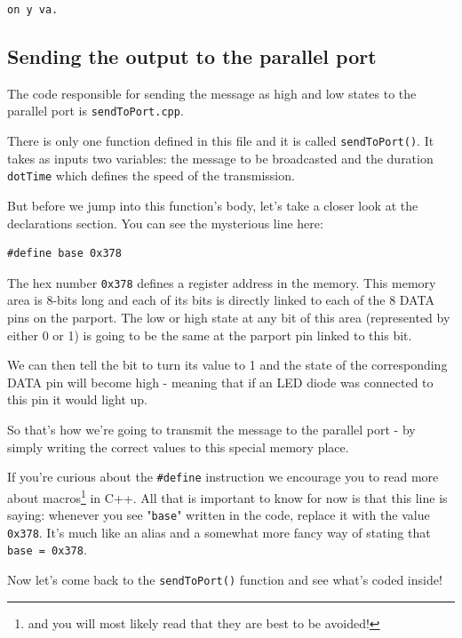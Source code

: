 \documentclass[12pt]{report}
\begin{document}
\begin{snugshade}
\verb|on y va.|
\end{snugshade}

\newpage

\subsection{Sending the output to the parallel port}

The code responsible for sending the message as high and low states to the parallel port is \verb|sendToPort.cpp|.

There is only one function defined in this file and it is called \texttt{sendToPort()}. It takes as inputs two variables: the message to be broadcasted and the duration \texttt{dotTime} which defines the speed of the transmission.

But before we jump into this function's body, let's take a closer look at the declarations section. You can see the mysterious line here:

\begin{lstlisting}
#define base 0x378
\end{lstlisting}

The hex number \texttt{0x378} defines a register address in the memory. This memory area is 8-bits long and each of its bits is directly linked to each of the 8 DATA pins on the parport. The low or high state at any bit of this area (represented by either 0 or 1) is going to be the same at the parport pin linked to this bit.

We can then tell the bit to turn its value to 1 and the state of the corresponding DATA pin will become high - meaning that if an LED diode was connected to this pin it would light up.

So that's how we're going to transmit the message to the parallel port - by simply writing the correct values to this special memory place.

If you're curious about the \texttt{\#define} instruction we encourage you to read more about macros\footnote{and you will most likely read that they are best to be avoided!} in C++. All that is important to know for now is that this line is saying: whenever you see "\texttt{base}" written in the code, replace it with the value \texttt{0x378}. It's much like an alias and a somewhat more fancy way of stating that \texttt{base = 0x378}.

Now let's come back to the \texttt{sendToPort()} function and see what's coded inside!
\end{document}
